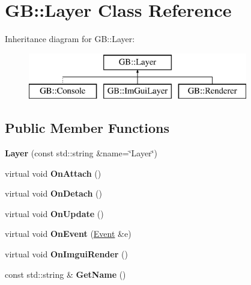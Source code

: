 \hypertarget{class_g_b_1_1_layer}{}\section{GB\+::Layer Class Reference}
\label{class_g_b_1_1_layer}
Inheritance diagram for GB\+::Layer\+:\begin{figure}[H]
\begin{center}
\leavevmode
\includegraphics[height=2.000000cm]{class_g_b_1_1_layer}
\end{center}
\end{figure}
\subsection*{Public Member Functions}
\begin{DoxyCompactItemize}
\item 
\mbox{\label{class_g_b_1_1_layer_a0471b435f29583c3882039bddd0867cf}} 
{\bfseries Layer} (const std\+::string \&name=\char`\"{}Layer\char`\"{})
\item 
\mbox{\label{class_g_b_1_1_layer_a781051f3144c786a7b8dc93af84d5788}} 
virtual void {\bfseries On\+Attach} ()
\item 
\mbox{\label{class_g_b_1_1_layer_a184b1598418883fb2a8b2d70b54d1353}} 
virtual void {\bfseries On\+Detach} ()
\item 
\mbox{\label{class_g_b_1_1_layer_ab15b87858d052c533a893b810cc99824}} 
virtual void {\bfseries On\+Update} ()
\item 
\mbox{\label{class_g_b_1_1_layer_a4583ade0ff4508fe228f0a099bc8e34b}} 
virtual void {\bfseries On\+Event} (\mbox{\hyperlink{class_g_b_1_1_event}{Event}} \&e)
\item 
\mbox{\label{class_g_b_1_1_layer_acf8441d34dc5d3295aacc2529b43e73d}} 
virtual void {\bfseries On\+Imgui\+Render} ()
\item 
\mbox{\label{class_g_b_1_1_layer_a98e6c41745bccb390f35b8ace77e2739}} 
const std\+::string \& {\bfseries Get\+Name} ()
\end{DoxyCompactItemize}
